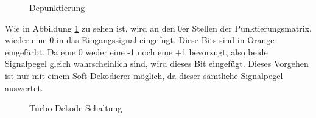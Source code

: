 \begin{figure}[!ht]
\centering
{}
\caption{Depunktierung}
\label{pic:TurboDecodeDepuncturing}
\end{figure}

Wie in Abbildung \ref{pic:TurboDecodeDepuncturing} zu sehen ist, wird an den 0er Stellen der Punktierungsmatrix, wieder eine 0 in das Eingangssignal eingefügt. Diese Bits sind in Orange eingefärbt. Da eine 0 weder eine -1 noch eine +1 bevorzugt, also beide Signalpegel gleich wahrscheinlich sind, wird dieses Bit eingefügt. Dieses Vorgehen ist nur mit einem Soft-Dekodierer möglich, da dieser sämtliche Signalpegel auswertet. 

\begin{figure}[!ht]
\centering
{}
\caption{Turbo-Dekode Schaltung}
\label{pic:TurboDecode}
\end{figure}

